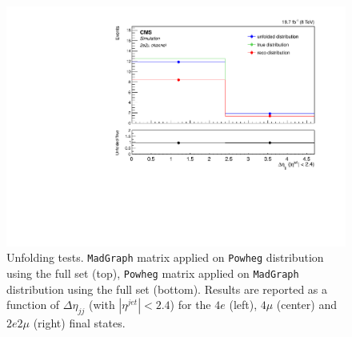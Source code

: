 \begin{figure}[hbtp]
\begin{center}
    \includegraphics[width=0.8\cmsFigWidth]{Figures/Unfolding/MCTests/CentralDeta_ZZTo2e2m_PowMatrix_MadDistr_FullSample_fr}  
 \caption{Unfolding tests. \texttt{MadGraph} matrix applied on \texttt{Powheg} distribution using the full set (top), \texttt{Powheg} matrix applied on \texttt{MadGraph} distribution using the full set (bottom). Results are reported as a function of $\Delta\eta_{jj}$ (with $|\eta^{jet}|<2.4$) for the $4e$ (left), $4\mu$ (center) and $2e2\mu$ (right) final states.}
    \label{fig:MCtest_CentralDeta2}
  \end{center}
\end{figure}
\clearpage 
